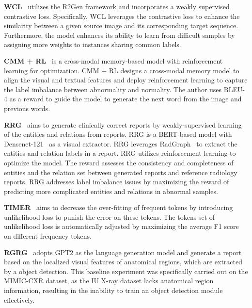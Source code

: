 \documentclass[sn-mathphys-num]{sn-jnl}%
\theoremstyle{thmstyleone}%
\theoremstyle{thmstyletwo}%
\theoremstyle{thmstylethree}%
\begin{document}
\textbf{WCL}~\cite{yan2021weakly} utilizes the R2Gen framework and incorporates a weakly supervised contrastive loss. Specifically, WCL leverages the contrastive loss to enhance the similarity between a given source image and its corresponding target sequence. Furthermore, the model enhances its ability to learn from difficult samples by assigning more weights to instances sharing common labels.

\textbf{CMM + RL}~\cite{qin2022reinforced} is a cross-modal memory-based model with reinforcement learning for optimization. CMM + RL designs a cross-modal memory model to align the visual and textual features and deploy reinforcement learning to capture the label imbalance between abnormality and normality.
The author uses BLEU-4 as a reward to guide the model to generate the next word from the image and previous words. 

\textbf{RRG}~\cite{delbrouck2022improving, delbrouck2023overview} aims to generate clinically correct reports by weakly-supervised learning of the entities and relations from reports. RRG is a BERT-based model with Densenet-121~\cite{huang2017densely} as a visual extractor. RRG leverages RadGraph~\cite{jain2021radgraph} to extract the entities and relation labels in a report. RRG utilizes reinforcement learning to optimize the model. The reward assesses the consistency and completeness of entities and the relation set between generated reports and reference radiology reports. RRG addresses label imbalance issues by maximizing the reward of predicting more complicated entities and relations in abnormal samples.

\textbf{TIMER}~\cite{wu2023token}  aims to decrease the over-fitting of frequent tokens by introducing unlikelihood loss to punish the error on these tokens. The tokens set of unlikelihood loss is automatically adjusted by maximizing the average F1 score on different frequency tokens. 

\textbf{RGRG}~\cite{tanida2023interactive} adopts GPT2 as  the language generation model and generate a report based on the localized visual features of anatomical regions, which are extracted by a object detection.
This baseline experiment was specifically carried out on the MIMIC-CXR dataset, as the IU X-ray dataset lacks anatomical region information, resulting in the inability to train an object detection module effectively.
\end{document}
